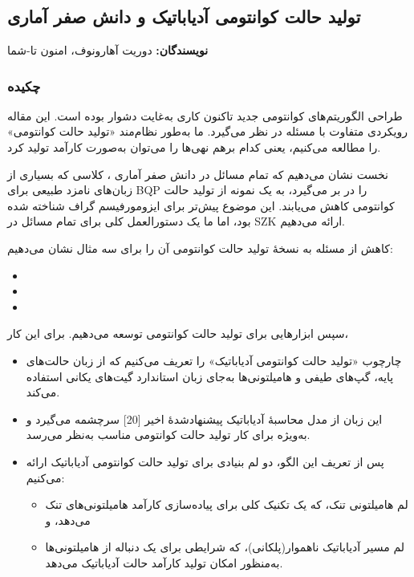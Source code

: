 \chapter{}
\section*{تولید حالت کوانتومی آدیاباتیک و دانش صفر آماری}

\textbf{نویسندگان:} دوریت آهارونوف، امنون تا-شما

\subsection*{چکیده}
طراحی الگوریتم‌های کوانتومی جدید تاکنون کاری به‌غایت دشوار بوده است. این مقاله رویکردی متفاوت با مسئله در نظر می‌گیرد. ما به‌طور نظام‌مند «تولید حالت کوانتومی» را مطالعه می‌کنیم، یعنی کدام برهم نهی‌ها را می‌توان به‌صورت کارآمد تولید کرد. 

نخست نشان می‌دهیم که تمام مسائل در دانش صفر آماری ، کلاسی که بسیاری از زبان‌های نامزد طبیعی برای BQP را در بر می‌گیرد، به یک نمونه از تولید حالت کوانتومی کاهش می‌یابند. این موضوع پیش‌تر برای ایزومورفیسم گراف شناخته شده بود، اما ما یک دستورالعمل کلی برای تمام مسائل در SZK ارائه می‌دهیم. 

کاهش از مسئله به نسخهٔ تولید حالت کوانتومی آن را برای سه مثال نشان می‌دهیم:
\begin{itemize}
	\item 
	\item
	\item
\end{itemize}

سپس ابزارهایی برای تولید حالت کوانتومی توسعه می‌دهیم. برای این کار، 
\begin{itemize}
	\item 
	چارچوب «تولید حالت کوانتومی آدیاباتیک» را تعریف می‌کنیم که از زبان حالت‌های پایه، گپ‌های طیفی و هامیلتونی‌ها به‌جای زبان استاندارد گیت‌های یکانی استفاده می‌کند. 
	\item
	این زبان از مدل محاسبهٔ آدیاباتیک پیشنهادشدهٔ اخیر [20] سرچشمه می‌گیرد و به‌ویژه برای کار تولید حالت کوانتومی مناسب به‌نظر می‌رسد. 
	\item
	
	پس از تعریف این الگو، دو لم بنیادی برای تولید حالت کوانتومی آدیاباتیک ارائه می‌کنیم:
	\begin{itemize}
		\item
		لم هامیلتونی تنک، که یک تکنیک کلی برای پیاده‌سازی کارآمد هامیلتونی‌های تنک می‌دهد، و
		\item
		لم مسیر آدیاباتیک ناهموار(پلکانی)، که شرایطی برای یک دنباله از هامیلتونی‌ها به‌منظور امکان تولید کارآمد حالت آدیاباتیک می‌دهد.
	\end{itemize}
\end{itemize}



